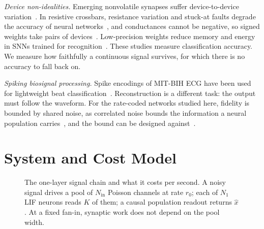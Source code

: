 \documentclass[conference]{IEEEtran}
\newcommand{\Nin}{N_\mathrm{in}}
\begin{document}
\emph{Device non-idealities.} Emerging nonvolatile synapses suffer
device-to-device variation~\cite{yu2018nvm}. In resistive crossbars,
resistance variation and stuck-at faults degrade the accuracy of neural
networks~\cite{chen2017rram}, and conductances cannot be negative, so signed
weights take pairs of devices~\cite{prezioso2015training}. Low-precision
weights reduce memory and energy in SNNs trained for
recognition~\cite{rathi2019stdp,putra2021qspinn}. These studies measure
classification accuracy. We measure how faithfully a continuous signal
survives, for which there is no accuracy to fall back on.

\emph{Spiking biosignal processing.} Spike encodings of MIT-BIH ECG have been
used for lightweight beat classification~\cite{sulistiyanto2025ecg}.
Reconstruction is a different task: the output must follow the waveform. For
the rate-coded networks studied here, fidelity is bounded by shared noise, as
correlated noise bounds the information a neural population
carries~\cite{morenobote2014information}, and the bound can be designed
against~\cite{baig2026icee}.

\section{System and Cost Model}
\label{sec:model}

\begin{figure}[t]
\centering
{}
\caption{The one-layer signal chain and what it costs per second. A noisy
signal drives a pool of $\Nin$ Poisson channels at rate $r_0$; each of $N_1$ LIF
neurons reads $K$ of them; a causal population readout returns $\hat{x}$. At a
fixed fan-in, synaptic work does not depend on the pool width.}
\label{fig:pipeline}
\end{figure}
\end{document}
